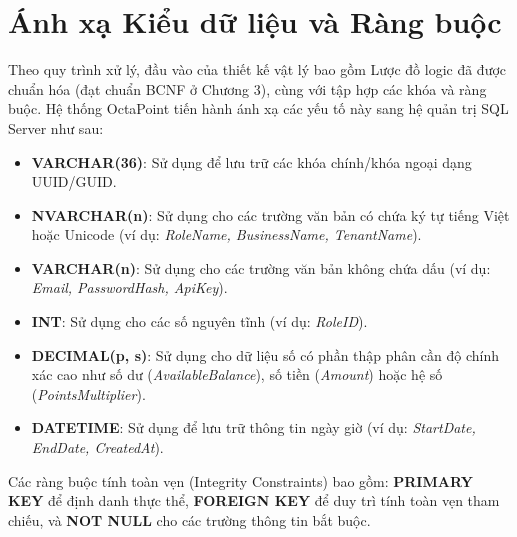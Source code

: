 \section{Ánh xạ Kiểu dữ liệu và Ràng buộc}

Theo quy trình xử lý, đầu vào của thiết kế vật lý bao gồm Lược đồ logic đã được chuẩn hóa (đạt chuẩn BCNF ở Chương 3), cùng với tập hợp các khóa và ràng buộc. Hệ thống OctaPoint tiến hành ánh xạ các yếu tố này sang hệ quản trị SQL Server như sau:
\begin{itemize}
    \item \textbf{VARCHAR(36)}: Sử dụng để lưu trữ các khóa chính/khóa ngoại dạng UUID/GUID.
    \item \textbf{NVARCHAR(n)}: Sử dụng cho các trường văn bản có chứa ký tự tiếng Việt hoặc Unicode (ví dụ: \textit{RoleName, BusinessName, TenantName}).
    \item \textbf{VARCHAR(n)}: Sử dụng cho các trường văn bản không chứa dấu (ví dụ: \textit{Email, PasswordHash, ApiKey}).
    \item \textbf{INT}: Sử dụng cho các số nguyên tĩnh (ví dụ: \textit{RoleID}).
    \item \textbf{DECIMAL(p, s)}: Sử dụng cho dữ liệu số có phần thập phân cần độ chính xác cao như số dư (\textit{AvailableBalance}), số tiền (\textit{Amount}) hoặc hệ số (\textit{PointsMultiplier}).
    \item \textbf{DATETIME}: Sử dụng để lưu trữ thông tin ngày giờ (ví dụ: \textit{StartDate, EndDate, CreatedAt}).
\end{itemize}

Các ràng buộc tính toàn vẹn (Integrity Constraints) bao gồm: \textbf{PRIMARY KEY} để định danh thực thể, \textbf{FOREIGN KEY} để duy trì tính toàn vẹn tham chiếu, và \textbf{NOT NULL} cho các trường thông tin bắt buộc.
